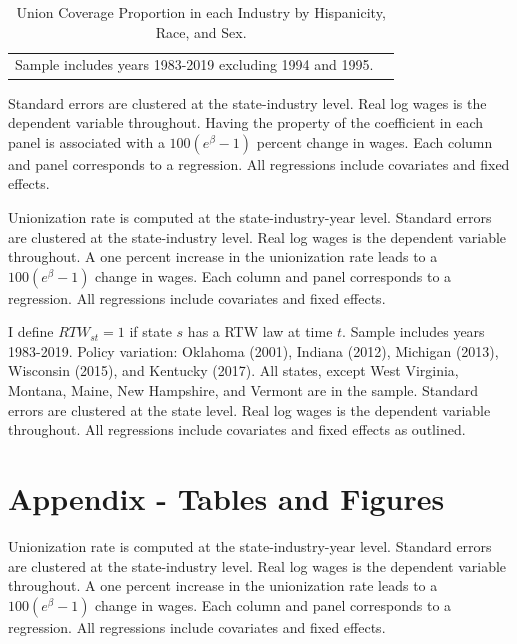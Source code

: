 \documentclass[11pt]{article}
\begin{document}
{\begin{landscape}
\small{\begin{table}[h!]
    \centering
    \caption{Union Coverage Proportion in each Industry by Hispanicity, Race, and Sex.}\label{tab:unindtab}
    \fontsize{10}{11}\selectfont
\begin{tabular}{l*{8}{c}}

\hline\hline
\multicolumn{8}{l}{\footnotesize Sample includes years 1983-2019 excluding 1994 and 1995.}\\
\end{tabular}
\end{table}}
\end{landscape}

\pagebreak
\small{}
\footnotesize{Standard errors are clustered at the state-industry level. Real log wages is the dependent variable throughout. Having the property of the coefficient in each panel is associated with a $ 100(e^\beta - 1) $ percent change in wages. Each column and panel corresponds to a regression. All regressions include covariates and fixed effects.}

\pagebreak
\small{}
\footnotesize{Unionization rate is computed at the state-industry-year level. Standard errors are clustered at the state-industry level. Real log wages is the dependent variable throughout. A one percent increase in the unionization rate leads to a $100(e^{\beta} - 1)$ change in wages. Each column and panel corresponds to a regression. All regressions include covariates and fixed effects.}

\pagebreak
\begin{landscape}
\small{}
\footnotesize{I define $RTW_{st} = 1$ if state $s$ has a RTW law at time $t$. Sample includes years 1983-2019. Policy variation: Oklahoma (2001), Indiana (2012), Michigan (2013), Wisconsin (2015), and Kentucky (2017). All states, except West Virginia, Montana, Maine, New Hampshire, and Vermont are in the sample. Standard errors are clustered at the state level. Real log wages is the dependent variable throughout. All regressions include covariates and fixed effects as outlined.}
\end{landscape}

\pagebreak
\section{Appendix - Tables and Figures}
\small{}
\footnotesize{Unionization rate is computed at the state-industry-year level. Standard errors are clustered at the state-industry level. Real log wages is the dependent variable throughout. A one percent increase in the unionization rate leads to a $100(e^{\beta} - 1)$ change in wages. Each column and panel corresponds to a regression. All regressions include covariates and fixed effects.}

}
\end{document}
